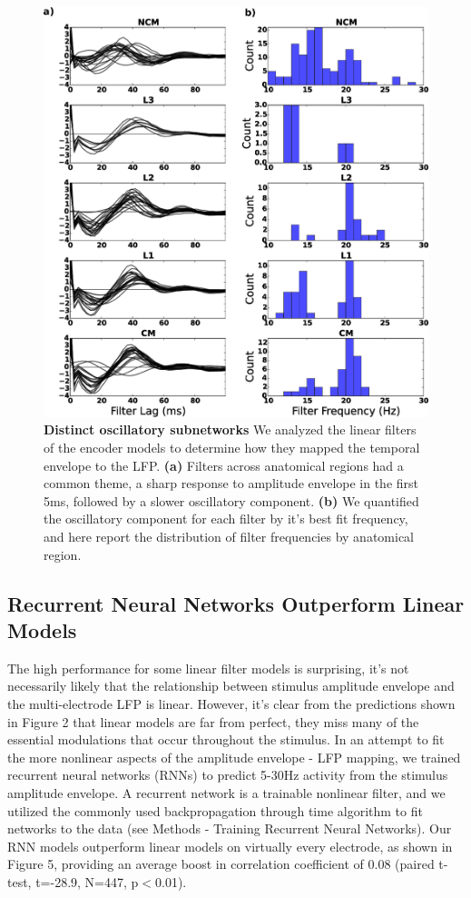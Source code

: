 \begin{figure}
    \caption{\textbf{Distinct oscillatory subnetworks} We analyzed the linear filters of the encoder models to determine how they mapped the temporal envelope to the LFP. \textbf{(a)} Filters across anatomical regions had a common theme, a sharp response to amplitude envelope in the first 5ms, followed by a slower oscillatory component. \textbf{(b)} We quantified the oscillatory component for each filter by it’s best fit frequency, and here report the distribution of filter frequencies by anatomical region.
}
    \centering
    \includegraphics[scale=0.25]{figure_2_4.eps}
\end{figure}

\subsection{Recurrent Neural Networks Outperform Linear Models}

The high performance for some linear filter models is surprising, it’s not necessarily likely that the relationship between stimulus amplitude envelope and the multi-electrode LFP is linear. However, it’s clear from the predictions shown in Figure 2 that linear models are far from perfect, they miss many of the essential modulations that occur throughout the stimulus. In an attempt to fit the more nonlinear aspects of the amplitude envelope - LFP mapping, we trained recurrent neural networks (RNNs) to predict 5-30Hz activity from the stimulus amplitude envelope. A recurrent network is a trainable nonlinear filter, and we utilized the commonly used backpropagation through time algorithm to fit networks to the data (see Methods - Training Recurrent Neural Networks). Our RNN models outperform linear models on virtually every electrode, as shown in Figure 5, providing an average boost in correlation coefficient of 0.08 (paired t-test, t=-28.9, N=447, p$<$0.01).

